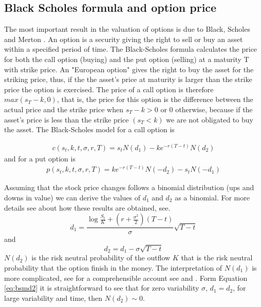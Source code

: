 \documentclass[11pt, onecolumn]{article}
\begin{document}
\subsection*{Black Scholes formula and option price}
The most important result in the valuation of options is due to Black, Scholes and Merton \citep{black_pricing_1973}. An option is a security giving the right to sell or buy an asset within a specified period of time. The Black-Scholes formula calculates the price for both the call option (buying) and the put option (selling) at a maturity T with strike price. An "European option" gives the right to buy the asset for the striking price, thus, if the the asset's price at maturity is larger than the strike price the option is exercised. The price of a call option is therefore $max(s_T - k, 0)$, that is, the price for this option is the difference between the actual price and the strike price when $s_T - k >0$ or 0 otherwise, because if the asset's price is less than the strike price $(s_T < k)$ we are not obligated to buy the asset. 
The Black-Scholes model for a call option is

\begin{equation}
\begin{split}
 c(s_t,k,t,\sigma,r,T)  = s_t N(d_1) - k e^{-r(T-t)}N(d_2)
 \end{split}
  \label{eq:bsmcall}
\end{equation}
and for a put option is
 \begin{equation}
\begin{split}
 p(s_t,k,t,\sigma,r,T)  = ke^{-r(T-t)}N(-d_2)- s_tN(-d_1)
 \end{split}
  \label{eq:bsmput}
 \end{equation}
 
Assuming that the stock price changes follows a binomial distribution (ups and downs in value) we can derive the values of $d_1$ and $d_2$ as a binomial. For more details see about how these results are obtained, see\citep{hull_options_2011}.
 \begin{equation}
 d_1 =  \frac{\log \frac{S_t}{K} + (r + \frac{\sigma^2}{2})(T-t)  }\sigma \sqrt{T-t}{}
 \label{eq:bsmd1}
 \end{equation}
 and 
 \begin{equation}
 d_2 = d_1 - \sigma \sqrt{T-t}{}
 \label{eq:bsmd2}
 \end{equation}
$N(d_2)$ is the risk neutral probability of the outflow $K$ that is the risk neutral probability that the option finish in the money. %
The interpretation of $N(d_1)$ is more complicated, see \citep{} for a comprehensible account see \citep{hull_options_2005} and \citep{duffie_dynamic_2001}. 
Form Equation \ref{eq:bsmd2} it is straightforward to see that for zero variability $\sigma$, $d_1 = d_2$, for large variability and time, then $N(d_2)\sim 0$.  
\end{document}

